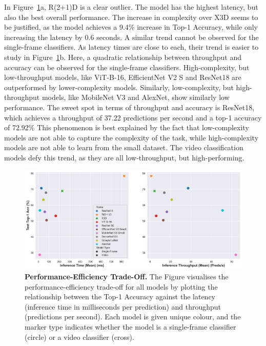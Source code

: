 \documentclass[a4paper]{article}
\begin{document}
  In Figure~\ref{fig:tradeoff}a, R(2+1)D is a clear outlier. The model has the
  highest latency, but also the best overall performance. The increase in
  complexity over X3D seems to be justified, as the model achieves a 9.4\%
  increase in Top-1 Accuracy, while only increasing the latency by 0.6 seconds.
  A similar trend cannot be observed for the single-frame classifiers. As
  latency times are close to each, their trend is easier to study in
  Figure~\ref{fig:tradeoff}b. Here, a quadratic relationship between throughput
  and accuracy can be observed for the single-frame classifiers.
  High-complexity, but low-throughput models, like ViT-B-16, EfficientNet V2 S
  and ResNet18 are outperformed by lower-complexity models. Similarly,
  low-complexity, but high-throughput models, like MobileNet V3 and AlexNet,
  show similarly low performance. The sweet spot in terms of throughput and
  accuracy is ResNet18, which achieves a throughput of 37.22 predictions per
  second and a top-1 accuracy of 72.92\% This phenomenon is best explained by
  the fact that low-complexity models are not able to capture the complexity of
  the task, while high-complexity models are not able to learn from the small
  dataset. The video classification models defy this trend, as they are all
  low-throughput, but high-performing.

  \begin{figure}
    \centering
    \includegraphics[width=\textwidth]{
    ./figures/performance-efficiency-tradeoff-scatter.png}
    \caption{
      \textbf{Performance-Efficiency Trade-Off.} The Figure visualises the
      performance-efficiency trade-off for all models by plotting the
      relationship between the Top-1 Accuracy against the latency (inference
      time in milliseconds per prediction) and throughput (predictions per
      second). Each model is given unique colour, and the marker type indicates
      whether the model is a single-frame classifier (circle) or a video
      classifier (cross).
    }

    \label{fig:tradeoff}
  \end{figure}
\end{document}
